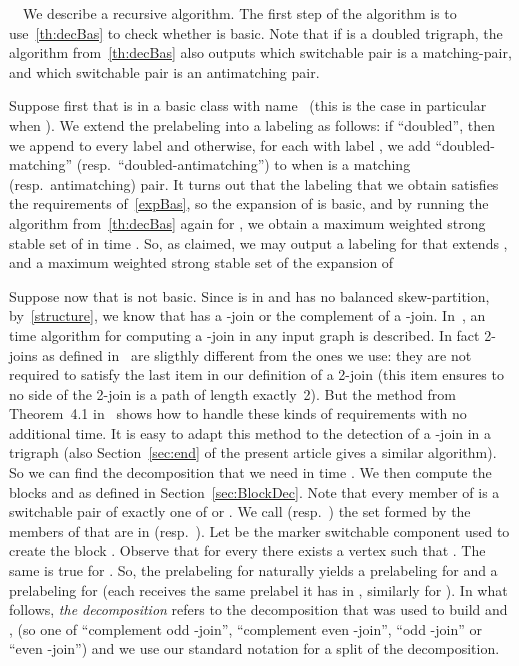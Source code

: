 \documentclass[11 pt] {article}
\newcounter{claim}
\newcommand{\Proof}{\setcounter{claim}{0}\noindent{\bf Proof.}\ \ }
\begin{document}
\Proof We describe a recursive algorithm.  The first step of the
algorithm is to use~\ref{th:decBas} to check whether  is basic.
Note that if  is a doubled trigraph, the algorithm
from~\ref{th:decBas} also outputs which switchable pair is a
matching-pair, and which switchable pair is an antimatching pair.

Suppose first that  is in a basic class with name~ (this is the
case in particular when ).  We extend the prelabeling
 into a labeling  as follows: if ``doubled'',
then we append  to every label and otherwise, for each  with label , we add ``doubled-matching'' (resp.\
``doubled-antimatching'') to  when  is a matching (resp.\
antimatching) pair.  It turns out that the labeling that we obtain
satisfies the requirements of~\ref{expBas}, so the expansion  of
 is basic, and by running the algorithm
from~\ref{th:decBas} again for , we obtain a maximum weighted
strong stable set of  in time .  So, as claimed, we may
output a labeling  for  that extends , and a maximum weighted strong stable set of the expansion of 

Suppose now that  is not basic.  Since  is in  and has
no balanced skew-partition, by~\ref{structure}, we know that  has a
-join or the complement of a -join.  In~\cite{ChHaTrVu:2-join},
an  time algorithm for computing a -join in any input graph
is described.  In fact 2-joins as defined in~\cite{ChHaTrVu:2-join}
are sligthly different from the ones we use: they are not required to
satisfy the last item in our definition of a 2-join (this item ensures
to no side of the 2-join is a path of length exactly~2).  But the
method from Theorem~4.1 in~\cite{ChHaTrVu:2-join} shows how to handle
these kinds of requirements  with no additional time.  It is easy to
adapt this method to the detection of a -join in a trigraph (also
Section~\ref{sec:end} of the present article gives a similar
algorithm).  So we can find the decomposition that we need in time
. We then compute the blocks  and  as defined in
Section~\ref{sec:BlockDec}.  Note that every member of  is a
switchable pair of exactly one of  or .  We call  (resp.\ ) the set formed by the members of  that are in  (resp.\ ). Let  be the marker switchable
component used to create the block .  Observe that for every  there exists a vertex  such that .  The same is true for .  So, the prelabeling
 for  naturally yields a prelabeling  for  and a prelabeling  for
 (each  receives the same prelabel
it has in , similarly for ).  In what follows,
\emph{the decomposition} refers to the decomposition that was used to
build  and , (so one of ``complement odd -join'',
``complement even -join'', ``odd -join'' or ``even -join'')
and we use our standard notation for a split of the decomposition.
\end{document}
